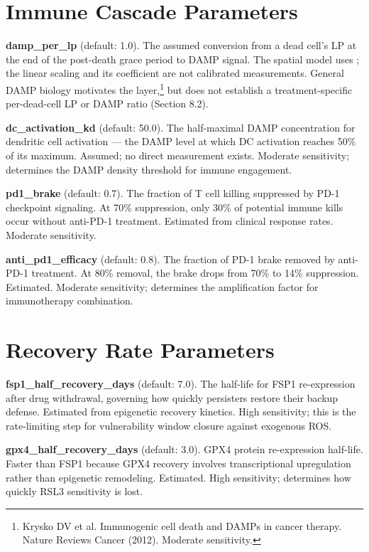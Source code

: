\documentclass[11pt,twoside,openright]{report}
\begin{document}
\section{Immune Cascade Parameters}

\textbf{damp\_per\_lp} (default: 1.0). The assumed conversion from a dead cell's LP at the end of the post-death grace period to DAMP signal. The spatial model uses ; the linear scaling and its coefficient are not calibrated measurements. General DAMP biology motivates the layer,\footnote{Krysko DV et al. Immunogenic cell death and DAMPs in cancer therapy. Nature Reviews Cancer (2012). Moderate sensitivity.} but does not establish a treatment-specific per-dead-cell LP or DAMP ratio (Section 8.2).

\textbf{dc\_activation\_kd} (default: 50.0). The half-maximal DAMP concentration for dendritic cell activation --- the DAMP level at which DC activation reaches 50\% of its maximum. Assumed; no direct measurement exists. Moderate sensitivity; determines the DAMP density threshold for immune engagement.

\textbf{pd1\_brake} (default: 0.7). The fraction of T cell killing suppressed by PD-1 checkpoint signaling. At 70\% suppression, only 30\% of potential immune kills occur without anti-PD-1 treatment. Estimated from clinical response rates. Moderate sensitivity.

\textbf{anti\_pd1\_efficacy} (default: 0.8). The fraction of PD-1 brake removed by anti-PD-1 treatment. At 80\% removal, the brake drops from 70\% to 14\% suppression. Estimated. Moderate sensitivity; determines the amplification factor for immunotherapy combination.

\section{Recovery Rate Parameters}

\textbf{fsp1\_half\_recovery\_days} (default: 7.0). The half-life for FSP1 re-expression after drug withdrawal, governing how quickly persisters restore their backup defense. Estimated from epigenetic recovery kinetics. High sensitivity; this is the rate-limiting step for vulnerability window closure against exogenous ROS.

\textbf{gpx4\_half\_recovery\_days} (default: 3.0). GPX4 protein re-expression half-life. Faster than FSP1 because GPX4 recovery involves transcriptional upregulation rather than epigenetic remodeling. Estimated. High sensitivity; determines how quickly RSL3 sensitivity is lost.
\end{document}
